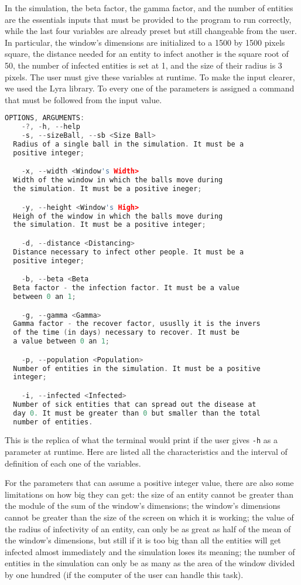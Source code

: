 \documentclass[a4paper, 11pt]{article}
\begin{document}
  In the simulation, the beta factor, the gamma factor, and the number of entities are the essentials inputs that must be provided to the program to run correctly, while the last four variables are already preset but still changeable from the user. In particular, the window's dimensions are initialized to a 1500 by 1500 pixels square, the distance needed for an entity to infect another is the square root of 50, the number of infected entities is set at 1, and the size of their radius is 3 pixels. The user must give these variables at runtime. To make the input clearer, we used the Lyra library. To every one of the parameters is assigned a command that must be followed from the input value.
  \begin{lstlisting}[language=c++, style=terminal]
  OPTIONS, ARGUMENTS:
    -?, -h, --help
    -s, --sizeBall, --sb <Size Ball>
  Radius of a single ball in the simulation. It must be a
  positive integer;

    -x, --width <Window's Width>
  Width of the window in which the balls move during
  the simulation. It must be a positive ineger;

    -y, --height <Window's High>
  Heigh of the window in which the balls move during
  the simulation. It must be a positive integer;

    -d, --distance <Distancing>
  Distance necessary to infect other people. It must be a
  positive integer;

    -b, --beta <Beta
  Beta factor - the infection factor. It must be a value
  between 0 an 1;

    -g, --gamma <Gamma>
  Gamma factor - the recover factor, ususlly it is the invers
  of the time (in days) necessary to recover. It must be
  a value between 0 an 1;

    -p, --population <Population>
  Number of entities in the simulation. It must be a positive
  integer;

    -i, --infected <Infected>
  Number of sick entities that can spread out the disease at
  day 0. It must be greater than 0 but smaller than the total
  number of entities.

  \end{lstlisting}

  This is the replica of what the terminal would print if the user gives \verb|-h| as a parameter at runtime. Here are listed all the characteristics and the interval of definition of each one of the variables.

  For the parameters that can assume a positive integer value, there are also some limitations on how big they can get: the size of an entity cannot be greater than the module of the sum of the window's dimensions; the window's dimensions cannot be greater than the size of the screen on which it is working; the value of the radius of infectivity of an entity, can only be as great as half of the mean of the window's dimensions, but still if it is too big than all the entities will get infected almost immediately and the simulation loses its meaning; the number of entities in the simulation can only be as many as the area of the window divided by one hundred (if the computer of the user can handle this task).
\end{document}

